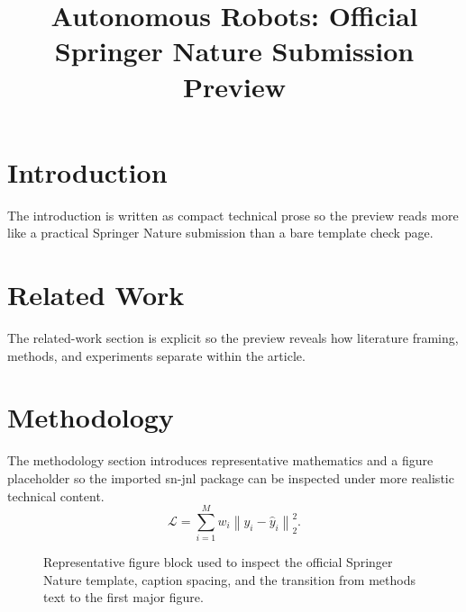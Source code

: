 \documentclass[pdflatex,sn-mathphys-num]{sn-jnl}
\begin{document}
\title[Article Title]{Autonomous Robots: Official Springer Nature Submission Preview}
\author*[1]{ }
\author[2]{ }
\maketitle
\section{Introduction}
The introduction is written as compact technical prose so the preview reads more like a practical Springer Nature submission than a bare template check page.
\section{Related Work}
The related-work section is explicit so the preview reveals how literature framing, methods, and experiments separate within the article.
\section{Methodology}
The methodology section introduces representative mathematics and a figure placeholder so the imported sn-jnl package can be inspected under more realistic technical content.
\begin{equation}
\mathcal{L} = \sum_{i=1}^{M} w_i \left\| y_i - \hat{y}_i \right\|_2^2.
\end{equation}
\begin{figure}[t]
\centering
{}
\caption{Representative figure block used to inspect the official Springer Nature template, caption spacing, and the transition from methods text to the first major figure.}
\end{figure}
\end{document}
